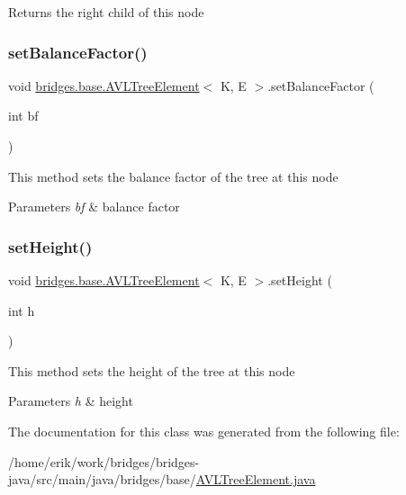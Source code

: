 \begin{DoxyReturn}{Returns}
the right child of this node 
\end{DoxyReturn}
\mbox{\label{classbridges_1_1base_1_1_a_v_l_tree_element_a0dc3c83e750cc39535afb08ea92f6c98}} 
\subsubsection{\texorpdfstring{set\+Balance\+Factor()}{setBalanceFactor()}}
{\footnotesize\ttfamily void \hyperlink{classbridges_1_1base_1_1_a_v_l_tree_element}{bridges.\+base.\+A\+V\+L\+Tree\+Element}$<$ K, E $>$.set\+Balance\+Factor (\begin{DoxyParamCaption}\item[{int}]{bf }\end{DoxyParamCaption})}

This method sets the balance factor of the tree at this node


\begin{DoxyParams}{Parameters}
{\em bf} & balance factor \\
\hline
\end{DoxyParams}
\mbox{\label{classbridges_1_1base_1_1_a_v_l_tree_element_ac42b744989ed7e18dcbd52980e674b33}} 
\subsubsection{\texorpdfstring{set\+Height()}{setHeight()}}
{\footnotesize\ttfamily void \hyperlink{classbridges_1_1base_1_1_a_v_l_tree_element}{bridges.\+base.\+A\+V\+L\+Tree\+Element}$<$ K, E $>$.set\+Height (\begin{DoxyParamCaption}\item[{int}]{h }\end{DoxyParamCaption})}

This method sets the height of the tree at this node


\begin{DoxyParams}{Parameters}
{\em h} & height \\
\hline
\end{DoxyParams}


The documentation for this class was generated from the following file\+:\begin{DoxyCompactItemize}
\item 
/home/erik/work/bridges/bridges-\/java/src/main/java/bridges/base/\hyperlink{_a_v_l_tree_element_8java}{A\+V\+L\+Tree\+Element.\+java}\end{DoxyCompactItemize}
